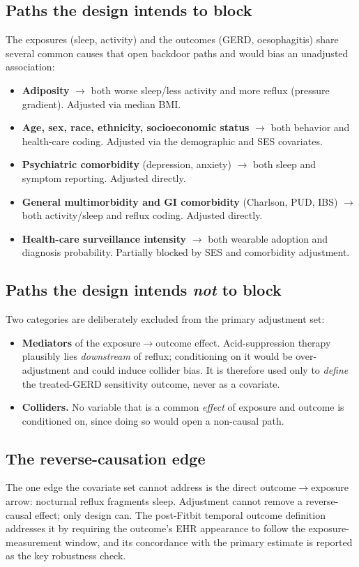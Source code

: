 \documentclass[11pt]{article}
\begin{document}
\subsection{Paths the design intends to block}
The exposures (sleep, activity) and the outcomes (GERD, oesophagitis) share several common causes that
open backdoor paths and would bias an unadjusted association:
\begin{itemize}[leftmargin=1.4em,itemsep=1pt]
  \item \textbf{Adiposity} $\rightarrow$ both worse sleep/less activity and more reflux (pressure
  gradient). Adjusted via median BMI.
  \item \textbf{Age, sex, race, ethnicity, socioeconomic status} $\rightarrow$ both behavior and
  health-care coding. Adjusted via the demographic and SES covariates.
  \item \textbf{Psychiatric comorbidity} (depression, anxiety) $\rightarrow$ both sleep and
  symptom reporting. Adjusted directly.
  \item \textbf{General multimorbidity and GI comorbidity} (Charlson, PUD, IBS) $\rightarrow$ both
  activity/sleep and reflux coding. Adjusted directly.
  \item \textbf{Health-care surveillance intensity} $\rightarrow$ both wearable adoption and diagnosis
  probability. Partially blocked by SES and comorbidity adjustment.
\end{itemize}

\subsection{Paths the design intends \emph{not} to block}
Two categories are deliberately excluded from the primary adjustment set:
\begin{itemize}[leftmargin=1.4em,itemsep=1pt]
  \item \textbf{Mediators} of the exposure$\rightarrow$outcome effect. Acid-suppression therapy plausibly
  lies \emph{downstream} of reflux; conditioning on it would be over-adjustment and could induce
  collider bias. It is therefore used only to \emph{define} the treated-GERD sensitivity outcome, never
  as a covariate.
  \item \textbf{Colliders.} No variable that is a common \emph{effect} of exposure and outcome is
  conditioned on, since doing so would open a non-causal path.
\end{itemize}

\subsection{The reverse-causation edge}
The one edge the covariate set cannot address is the direct outcome$\rightarrow$exposure arrow: nocturnal
reflux fragments sleep. Adjustment cannot remove a reverse-causal effect; only design can. The
post-Fitbit temporal outcome definition addresses it by requiring the outcome's EHR appearance to follow
the exposure-measurement window, and its concordance with the primary estimate is reported as the key
robustness check.
\end{document}
